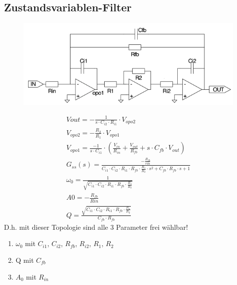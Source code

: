 \subsection{Zustandsvariablen-Filter}
\begin{figure}[!h]
\centering
 \includegraphics[scale=0.4]{pictures/zustandsvariable}
\end{figure}
\begin{gather}
V{out}=-\frac{1}{s\cdot C_{i2}\cdot R_{i1}}\cdot V_{opo2}\\
V_{opo2}=-\frac{R_2}{R_1}\cdot V_{opo1}\\
V_{opo1}=\frac{-1}{s\cdot C_{i1}}\cdot (\frac{V_{in}}{R_{in}}+\frac{V_{out}}{R_{fb}}+s\cdot C_{fb}\cdot V_{out})\\
G_{ss}(s)=\frac{-\frac{R_{fb}}{rin}}{C_{i1}\cdot C_{i2}\cdot R_{i1}\cdot R_{fb}\cdot \frac{R_1}{R_2}\cdot s^2+C_{fb}\cdot R_{fb}\cdot s+1}\\
\omega_{0}=\frac{1}{\sqrt{C_{i1}\cdot C_{i2}\cdot R_{i1}\cdot R_{fb}\cdot \frac{R_1}{R_2}}}\\
A0=-\frac{R_{fb}}{Rin}\\
Q=\frac{\sqrt{C_{i1}\cdot C_{i2}\cdot R_{i1}\cdot R_{fb}\cdot \frac{R_1}{R_2}}}{C_{fb}\cdot R_{fb}}
\end{gather}
D.h. mit dieser Topologie sind alle 3 Parameter frei wählbar!
\begin{enumerate}
  \item $\omega_{0}$ mit $C_{i1}$, $C_{i2}$, $R_{fb}$, $R_{i2}$, $R_1$, $R_2$
  \item Q mit $C_{fb}$
  \item $A_0$ mit $R_{in}$
\end{enumerate}


